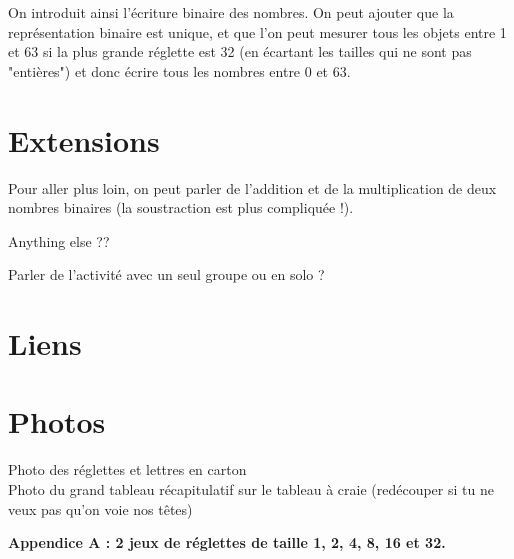 \documentclass[a4paper,12pt]{scrartcl}
\begin{document}
On introduit ainsi l'écriture binaire des nombres.
On peut ajouter que la représentation binaire est unique, et que l'on peut mesurer tous les objets entre 1 et 63 si la plus grande réglette est 32 (en écartant les tailles qui ne sont pas "entières") et donc écrire tous les nombres entre 0 et 63.


\section{Extensions}

Pour aller plus loin, on peut parler de l'addition et de la multiplication de deux nombres binaires (la soustraction est plus compliquée !).


Anything else ??


Parler de l'activité avec un seul groupe ou en solo ?


\section{Liens}




\section{Photos}

Photo des réglettes et lettres en carton\\
Photo du grand tableau récapitulatif sur le tableau à craie (redécouper si tu ne veux pas qu'on voie nos têtes)


\appendix
\newpage
\thispagestyle{empty}
\bf{Appendice A :} 2 jeux de réglettes de taille 1, 2, 4, 8, 16 et 32.
\bigskip
\bigskip
~\\

\end{document}
